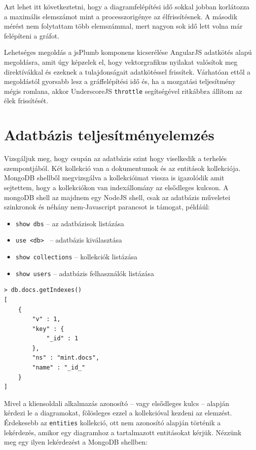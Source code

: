 Azt lehet itt következtetni, hogy a diagramfelépítési idő sokkal jobban korlátozza a maximális elemszámot mint a processzorigénye az élfrissítésnek. A második mérést nem folytattam több elemszámmal, mert nagyon sok idő lett volna már felépíteni a gráfot. 

Lehetséges megoldás a jsPlumb komponens kicserélése AngularJS adatkötés alapú megoldásra, amit úgy képzelek el, hogy vektorgrafikus nyilakat valósítok meg direktívákkal és ezeknek a tulajdonságait adatkötéssel frissítek. Várhatóan ettől a megoldástól gyorsabb lesz a gráffelépítési idő és, ha a mozgatási teljesítmény mégis romlana, akkor UnderscoreJS \lstinline{throttle} segítségével ritkábbra állítom az élek frissítését.

\section{Adatbázis teljesítményelemzés}
\label{sec:dbprof}
Vizsgáljuk meg, hogy csupán az adatbázis szint hogy viselkedik a terhelés szempontjából. Két kollekció van a dokumentumok és az entitások kollekciója. MongoDB shellből megvizsgálva a kollekcióimat vissza is igazolódik amit sejtettem, hogy a kollekciókon van indexállomány az elsődleges kulcson. A mongoDB shell az majdnem egy NodeJS shell, csak az adatbázis műveletei szinkronok és néhány nem-Javascript parancsot is támogat, példáúl:

\begin{itemize}
\item \lstinline{show dbs} -- az adatbázisok listázása
\item \lstinline{use <db> } -- adatbázis kiválasztása  
\item \lstinline{show collections} -- kollekciók listázása
\item \lstinline{show users} -- adatbázis felhasználók listázása
\end{itemize}

\begin{lstlisting}[caption=A diagram kollekció indexei]
> db.docs.getIndexes()
[
    {
        "v" : 1,
        "key" : {
            "_id" : 1
        },
        "ns" : "mint.docs",
        "name" : "_id_"
    }
]
\end{lstlisting}

Mivel a kliensoldali alkalmazás azonosító -- vagy elsődleges kulcs -- alapján kérdezi le a diagramokat, fölösleges ezzel a kollekcióval kezdeni az elemzést. Érdekesebb az \lstinline{entities} kollekció, ott nem azonosító alapján történik a lekérdezés, amikor egy diagramhoz a tartalmazott entitásokat kérjük.
Nézzünk meg egy ilyen lekérdezést a MongoDB shellben:

